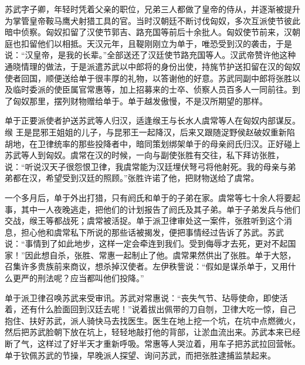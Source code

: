 \documentclass[12pt,UTF-8,openany,a4]{ctexbook}
\begin{document}
\begin{large}
    \yiwen 
    苏武字子卿，年轻时凭着父亲的职位，兄弟三人都做了皇帝的侍从，并逐渐被提升为掌管皇帝鞍马鹰犬射猎工具的官。当时汉朝廷不断讨伐匈奴，多次互派使节彼此暗中侦察。匈奴扣留了汉使节郭吉、路充国等前后十余批人。匈奴使节前来，汉朝庭也扣留他们以相抵。天汉元年，且鞮刚刚立为单于，唯恐受到汉的袭击，于是说：“汉皇帝，是我的长辈。”全部送还了汉廷使节路充国等人。汉武帝赞许他这种通晓情理的做法，于是派遣苏武以中郎将的身份出使，持旄节护送扣留在汉的匈奴使者回国，顺便送给单于很丰厚的礼物，以答谢他的好意。苏武同副中郎将张胜以及临时委派的使臣属官常惠等，加上招募来的士卒、侦察人员百多人一同前往。到了匈奴那里，摆列财物赠给单于。单于越发傲慢，不是汉所期望的那样。
    
    单于正要派使者护送苏武等人归汉，适逢缑王与长水人虞常等人在匈奴内部谋反。缑 王是昆邪王姐姐的儿子，与昆邪王一起降汉，后来又跟随浞野侯赵破奴重新陷胡地，在卫律统率的那些投降者中，暗同策划绑架单于的母亲阏氏归汉。正好碰上苏武等人到匈奴。虞常在汉的时候，一向与副使张胜有交往，私下拜访张胜，说：“听说汉天子很怨恨卫律，我虞常能为汉廷埋伏弩弓将他射死。我的母亲与弟弟都在汉，希望受到汉廷的照顾。”张胜许诺了他，把财物送给了虞常。
    
    一个多月后，单于外出打猎，只有阏氏和单于的子弟在家。虞常等七十余人将要起事，其中一人夜晚逃走，把他们的计划报告了阏氏及其子弟。单于子弟发兵与他们交战，缑王等都战死；虞常被活捉。单于派卫律审处这一案件，张胜听到这个消息，担心他和虞常私下所说的那些话被揭发，便把事情经过告诉了苏武。苏武说：“事情到了如此地步，这样一定会牵连到我们。受到侮辱才去死，更对不起国家！”因此想自杀，张胜、常惠一起制止了他。虞常果然供出了张胜。单于大怒，召集许多贵族前来商议，想杀掉汉使者。左伊秩訾说：“假如是谋杀单于，又用什么更严的刑法呢？应当都叫他们投降。”
    
    单于派卫律召唤苏武来受审讯。苏武对常惠说：“丧失气节、玷辱使命，即使活着，还有什么脸面回到汉廷去呢！”说着拔出佩带的刀自刎，卫律大吃一惊，自己抱住、扶好苏武，派人骑快马去找医生。医生在地上挖一个坑，在坑中点燃微火，然后把苏武脸朝下放在坑上，轻轻地敲打他的背部，让淤血流出来。苏武本来已经断了气，这样过了好半天才重新呼吸。常惠等人哭泣着，用车子把苏武拉回营帐。单于钦佩苏武的节操，早晚派人探望、询问苏武，而把张胜逮捕监禁起来。
    

\end{large}
\end{document}
